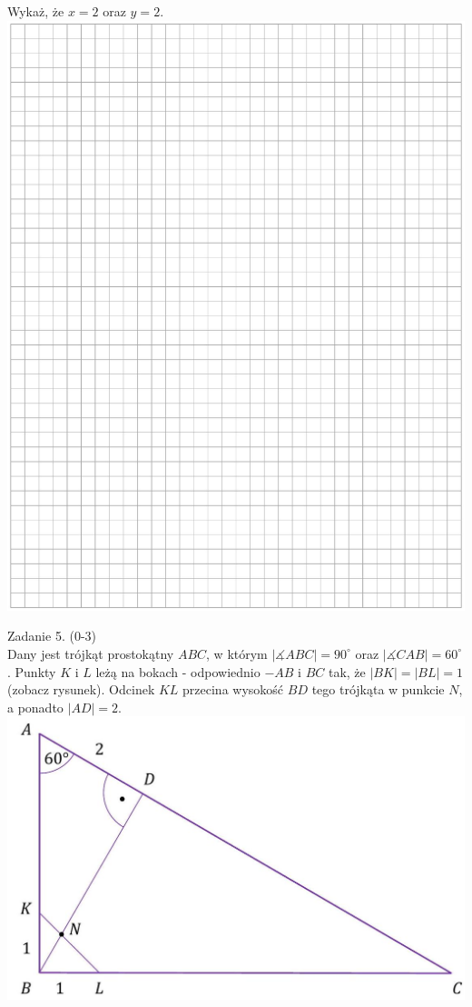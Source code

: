\documentclass[10pt]{article}
\begin{document}
Wykaż, że \(x=2\) oraz \(y=2\).\\
\includegraphics[max width=\textwidth, center]{2024_11_21_f1ecc00f5c4ab21f0d04g-07}

Zadanie 5. (0-3)\\
Dany jest trójkąt prostokątny \(A B C\), w którym \(|\measuredangle A B C|=90^{\circ}\) oraz \(|\measuredangle C A B|=60^{\circ}\). Punkty \(K\) i \(L\) leżą na bokach - odpowiednio \(-A B\) i \(B C\) tak, że \(|B K|=|B L|=1\) (zobacz rysunek). Odcinek \(K L\) przecina wysokość \(B D\) tego trójkąta w punkcie \(N\), a ponadto \(|A D|=2\).\\
\includegraphics[max width=\textwidth, center]{2024_11_21_f1ecc00f5c4ab21f0d04g-08(1)}
\end{document}
